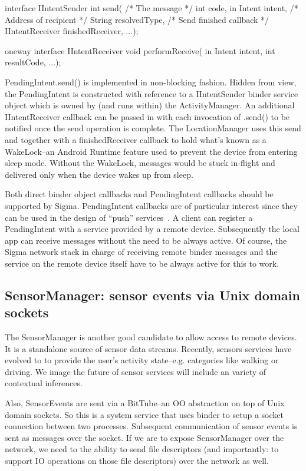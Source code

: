 \documentclass[prodmode]{acmlarge}
\begin{document}
\begin{snippet}
interface IIntentSender {
  int send(
    /* The message */
    int code, in Intent intent,
    /* Address of recipient */
    String resolvedType,
    /* Send finished callback */
    IIntentReceiver finishedReceiver,
    ...);
}
\end{snippet}

\begin{snippet}
oneway interface IIntentReceiver {
  void performReceive(
      in Intent intent, int resultCode,
      ...);
}
\end{snippet}

PendingIntent.send() is implemented in non-blocking fashion. Hidden from view, the PendingIntent is constructed with reference to a IIntentSender binder service object which is owned by (and runs within) the ActivityManager. An additional IIntentReceiver callback can be passed in with each invocation of .send() to be notified once the send operation is complete. The LocationManager uses this send and together with a finishedReceiver callback to hold what's known as a WakeLock--an Android Runtime feature used to prevent the device from entering sleep mode. Without the WakeLock, messages would be stuck in-flight and delivered only when the device wakes up from sleep.

Both direct binder object callbacks and PendingIntent callbacks should be supported by Sigma. PendingIntent callbacks are of particular interest since they can be used in the design of ``push'' services~\cite{PushTechnology}. A client can register a PendingIntent with a service provided by a remote device. Subsequently the local app can receive messages without the need to be always active. Of course, the Sigma network stack in charge of receiving remote binder messages and the service on the remote device itself have to be always active for this to work.

\subsection{SensorManager: sensor events via Unix domain sockets}
The SensorManager is another good candidate to allow access to remote devices. It is a standalone source of sensor data streams. Recently, sensors services have evolved to to provide the user's activity state--e.g. categories like walking or driving. We image the future of sensor services will include an variety of contextual inferences.

Also, SensorEvents are sent via a BitTube--an OO abstraction on top of Unix domain sockets. So this is a system service that uses binder to setup a socket connection between two processes. Subsequent communication of sensor events is sent as messages over the socket. If we are to expose SensorManager over the network, we need to the ability to send file descriptors (and importantly: to support IO operations on those file descriptors) over the network as well.
\end{document}
